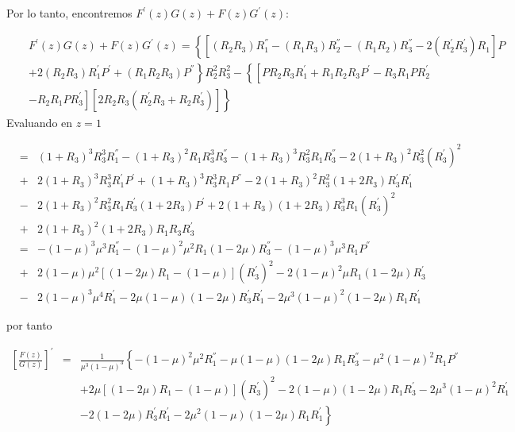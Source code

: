 \documentclass{article}
\begin{document}
Por lo tanto, encontremos $F^{'}\left(z\right)G\left(z\right)+F\left(z\right)G^{'}\left(z\right)$:

\begin{eqnarray*}
&&F^{'}\left(z\right)G\left(z\right)+F\left(z\right)G^{'}\left(z\right)=
\left\{\left[\left(R_{2}R_{3}\right)R_{1}^{''}
-\left(R_{1}R_{3}\right)R_{2}^{''}
-\left(R_{1}R_{2}\right)R_{3}^{''}
-2\left(R_{2}^{'}R_{3}^{'}\right)R_{1}\right]P\right.\\
&&\left.+2\left(R_{2}R_{3}\right)R_{1}^{'}P^{'}
+\left(R_{1}R_{2}R_{3}\right)P^{''}\right\}R_{2}^{2}R_{3}^{2}
-\left\{\left[PR_{2}R_{3}R_{1}^{'}+R_{1}R_{2}R_{3}P^{'}
-R_{3}R_{1}PR_{2}^{'}\right.\right.\\
&&\left.\left.
-R_{2}R_{1}PR_{3}^{'}\right]\left[2R_{2}R_{3}\left(R_{2}^{'}R_{3}+R_{2}R_{3}^{'}\right)\right]\right\}
\end{eqnarray*}
Evaluando en $z=1$

\begin{eqnarray*}
&=&\left(1+R_{3}\right)^{3}R_{3}^{3}R_{1}^{''}-\left(1+R_{3}\right)^{2}R_{1}R_{3}^{3}R_{3}^{''}
-\left(1+R_{3}\right)^{3}R_{3}^{2}R_{1}R_{3}^{''}-2\left(1+R_{3}\right)^{2}R_{3}^{2}
\left(R_{3}^{'}\right)^{2}\\
&+&2\left(1+R_{3}\right)^{3}R_{3}^{3}R_{1}^{'}P^{'}
+\left(1+R_{3}\right)^{3}R_{3}^{3}R_{1}P^{''}
-2\left(1+R_{3}\right)^{2}R_{3}^{2}\left(1+2R_{3}\right)R_{3}^{'}R_{1}^{'}\\
&-&2\left(1+R_{3}\right)^{2}R_{3}^{2}R_{1}R_{3}^{'}\left(1+2R_{3}\right)P^{'}
+2\left(1+R_{3}\right)\left(1+2R_{3}\right)R_{3}^{3}R_{1}\left(R_{3}^{'}\right)^{2}\\
&+&2\left(1+R_{3}\right)^{2}\left(1+2R_{3}\right)R_{1}R_{3}R_{3}^{'}\\
&=&-\left(1-\mu\right)^{3}\mu^{3}R_{1}^{''}-\left(1-\mu\right)^{2}\mu^{2}R_{1}\left(1-2\mu\right)R_{3}^{''}
-\left(1-\mu\right)^{3}\mu^{3}R_{1}P^{''}\\
&+&2\left(1-\mu\right)\mu^{2}\left[\left(1-2\mu\right)R_{1}-\left(1-\mu\right)\right]\left(R_{3}^{'}\right)^{2}
-2\left(1-\mu\right)^{2}\mu R_{1}\left(1-2\mu\right)R_{3}^{'}\\
&-&2\left(1-\mu\right)^{3}\mu^{4}R_{1}^{'}-2\mu\left(1-\mu\right)\left(1-2\mu\right)R_{3}^{'}R_{1}^{'}
-2\mu^{3}\left(1-\mu\right)^{2}\left(1-2\mu\right)R_{1}R_{1}^{'}
\end{eqnarray*}

por tanto

\begin{eqnarray*}
\left[\frac{F\left(z\right)}{G\left(z\right)}\right]^{'}&=&\frac{1}{\mu^{3}\left(1-\mu\right)^{3}}\left\{
-\left(1-\mu\right)^{2}\mu^{2}R_{1}^{''}-\mu\left(1-\mu\right)\left(1-2\mu\right)R_{1}R_{3}^{''}
-\mu^{2}\left(1-\mu\right)^{2}R_{1}P^{''}\right.\\
&&\left.+2\mu\left[\left(1-2\mu\right)R_{1}-\left(1-\mu\right)\right]\left(R_{3}^{'}\right)^{2}
-2\left(1-\mu\right)\left(1-2\mu\right)R_{1}R_{3}^{'}-2\mu^{3}\left(1-\mu\right)^{2}R_{1}^{'}\right.\\
&&\left.-2\left(1-2\mu\right)R_{3}^{'}R_{1}^{'}-2\mu^{2}\left(1-\mu\right)\left(1-2\mu\right)R_{1}R_{1}^{'}\right\}
\end{eqnarray*}
\end{document}
